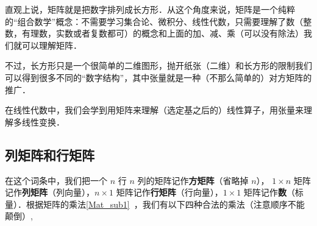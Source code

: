 


直观上说，矩阵就是把数字排列成长方形．从这个角度来说，矩阵是一个纯粹的“组合数学”概念：不需要学习集合论、微积分、线性代数，只需要理解了数（整数，有理数，实数或者复数都可）的概念和上面的加、减、乘（可以没有除法）我们就可以理解矩阵．

不过，长方形只是一个很简单的二维图形，抛开纸张（二维）和长方形的限制我们可以得到很多不同的“数字结构”，其中张量就是一种（不那么简单的）对方矩阵的推广．

在线性代数中，我们会学到用矩阵来理解（选定基之后的）线性算子，用张量来理解多线性变换．

\subsection{列矩阵和行矩阵}
在这个词条中，我们把一个 $n$ 行 $n$ 列的矩阵记作\textbf{方矩阵}（省略掉 $n$）， $1 \times n$ 矩阵记作\textbf{列矩阵}（列向量），$n \times 1$ 矩阵记作\textbf{行矩阵}（行向量），$1 \times 1$ 矩阵记作\textbf{数}（标量）．根据矩阵的乘法\autoref{Mat_sub1}~，我们有以下四种合法的乘法（注意顺序不能颠倒）,

